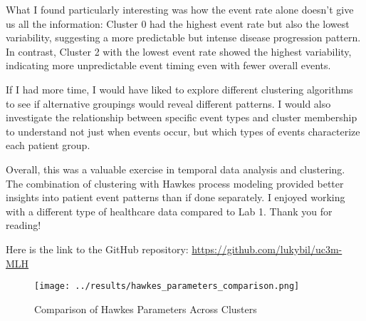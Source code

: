 \documentclass[a4paper,12pt]{article}
\begin{document}
What I found particularly interesting was how the event rate alone doesn't give us all the information: Cluster 0 had the highest event rate but also the lowest variability, suggesting a more predictable but intense disease progression pattern. In contrast, Cluster 2 with the lowest event rate showed the highest variability, indicating more unpredictable event timing even with fewer overall events.

If I had more time, I would have liked to explore different clustering algorithms to see if alternative groupings would reveal different patterns. I would also investigate the relationship between specific event types and cluster membership to understand not just when events occur, but which types of events characterize each patient group.

Overall, this was a valuable exercise in temporal data analysis and clustering. The combination of clustering with Hawkes process modeling provided better insights into patient event patterns than if done separately. I enjoyed working with a different type of healthcare data compared to Lab 1. Thank you for reading!

\vspace{1cm}
Here is the link to the GitHub repository: \url{https://github.com/lukybil/uc3m-MLH}

\begin{figure}[h]
  \centering
  \texttt{[image: ../results/hawkes\_parameters\_comparison.png]}
  \caption{Comparison of Hawkes Parameters Across Clusters}
  \label{fig:hawkes_parameters_comparison}
\end{figure}
\end{document}
